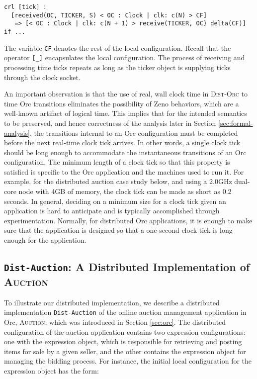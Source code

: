 \documentclass{eptcs}
\begin{document}
\begin{small}
\begin{verbatim}
crl [tick] : 
  [received(OC, TICKER, S) < OC : Clock | clk: c(N) > CF]
   => [< OC : Clock | clk: c(N + 1) > receive(TICKER, OC) delta(CF)]  if ...
\end{verbatim}
\end{small}

\noindent The variable \texttt{CF} denotes the rest of the local configuration. Recall that the operator \texttt{[\_]} encapsulates the local configuration. The process of receiving and processing time ticks repeats as long as the ticker object is supplying ticks through the clock socket.


An important observation is that the use of real, wall clock time in \textsc{Dist-Orc} to time Orc transitions eliminates the possibility of Zeno behaviors, which are a well-known artifact of logical time. This implies that for the intended semantics to be preserved, and hence correctness of the analysis later in Section \ref{sec:formal-analysis}, the transitions internal to an Orc configuration must be completed before the next real-time clock tick arrives. In other words, a single clock tick should be long enough to accommodate the instantaneous transitions of an Orc configuration. The minimum length of a clock tick so that this property is satisfied is specific  to the Orc application and the machines used to run it. For example, for the distributed auction case study below, and using a 2.0GHz dual-core node with 4GB of memory, the clock tick can be made as short as 0.2 seconds. In general, deciding on a minimum size for a clock tick given an application is hard to anticipate and is typically accomplished through experimentation. Normally, for distributed Orc applications, it is enough to make sure that the application is designed so that a one-second clock tick is long enough for the application.


\subsection{\texttt{Dist-Auction}: A Distributed Implementation of \textsc{Auction}} \label{sec:auction-example}


To illustrate our distributed implementation, we describe a distributed implementation \texttt{Dist-Auction} of the online auction management application in Orc, \textsc{Auction}, which was introduced in Section \ref{sec:orc}. The distributed configuration of the auction application contains two expression configurations: one with the  expression object, which is responsible for retrieving and posting items for sale by a given seller, and the other contains the  expression object for managing the bidding process. For instance, the initial local configuration for the  expression object has the form:
\end{document}
